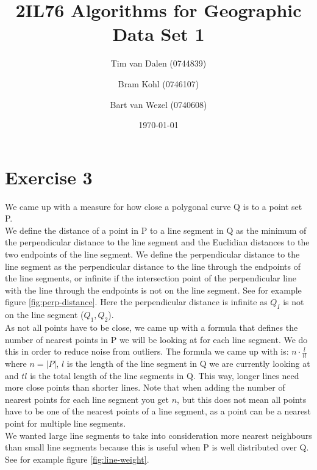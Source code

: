 \documentclass[a4paper,11pt]{article}
\title{
	2IL76 Algorithms for Geographic Data Set 1 \\
}
\author{
	Tim van Dalen (0744839)
	\and
	Bram Kohl (0746107)
	\and
	Bart van Wezel (0740608)
}
\date{\today}
\begin{document}
	\maketitle
	
\section*{Exercise 3}
We came up with a measure for how close a polygonal curve Q is to a point set P.\\

We define the distance of a point in P to a line segment in Q as the minimum of the perpendicular distance to the line segment and the Euclidian distances to the two endpoints of the line segment. We define the perpendicular distance to the line segment as the perpendicular distance to the line through the endpoints of the line segments, or infinite if the intersection point of the perpendicular line with the line through the endpoints is not on the line segment. See for example figure \ref{fig:perp-distance}. Here the perpendicular distance is infinite as $Q_I$ is not on the line segment ($Q_1,Q_2$). \\


As not all points have to be close, we came up with a formula that defines the number of nearest points in P we will be looking at for each line segment. We do this in order to reduce noise from outliers. The formula we came up with is: $n\cdot \frac{l}{tl}$ where $n = |P|$, $l$ is the length of the line segment in Q we are currently looking at and $tl$ is the total length of the line segments in Q. This way, longer lines need more close points than shorter lines. Note that when adding the number of nearest points for each line segment you get $n$, but this does not mean all points have to be one of the nearest points of a line segment, as a point can be a nearest point for multiple line segments.\\

We wanted large line segments to take into consideration more nearest neighbours than small line segments because this is useful when P is well distributed over Q. See for example figure \ref{fig:line-weight}. %


 
	
\end{document}
